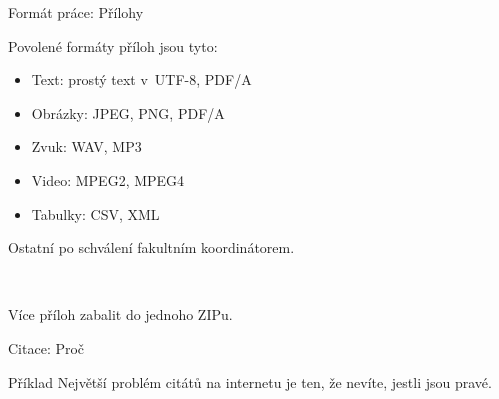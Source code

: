 \documentclass{beamer}
\begin{document}
\begin{frame}{Formát práce: Přílohy}

Povolené formáty příloh jsou tyto:

\begin{itemize}
\item Text: prostý text v~UTF-8, PDF/A
\item Obrázky: JPEG, PNG, PDF/A
\item Zvuk: WAV, MP3
\item Video: MPEG2, MPEG4
\item Tabulky: CSV, XML
\end{itemize}

Ostatní po schválení fakultním koordinátorem.

~

Více příloh zabalit do jednoho ZIPu.

\end{frame}

\begin{frame}{Citace: Proč}

\begin{block}{Příklad}
Největší problém citátů na internetu je ten,
že nevíte, jestli jsou pravé.

\end{block}

\end{frame}
\end{document}
